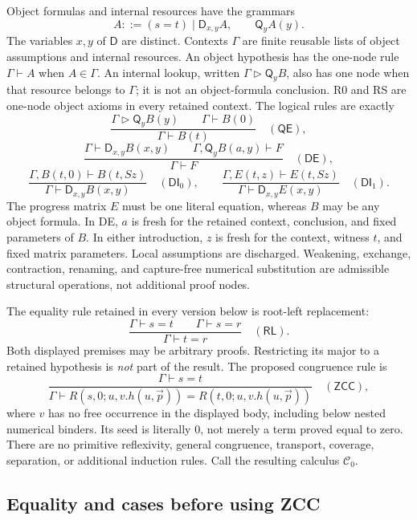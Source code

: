 Object formulas and internal resources have the grammars
\[
 A::=(s=t)\mid\mathsf D_{x,y}A,
 \qquad \mathsf Q_yA(y).
\]
The variables $x,y$ of $\mathsf D$ are distinct. Contexts $\Gamma$ are
finite reusable lists of object assumptions and internal resources.
An object hypothesis has the one-node rule $\Gamma\vdash A$ when
$A\in\Gamma$. An internal lookup, written
$\Gamma\mathrel{\triangleright}\mathsf Q_yB$, also has one node when
that resource belongs to $\Gamma$; it is not an object-formula conclusion.
R0 and RS are one-node object axioms in every retained context.
The logical rules are exactly
\[
 \frac{\Gamma\mathrel{\triangleright}\mathsf Q_yB(y)
       \qquad\Gamma\vdash B(0)}
      {\Gamma\vdash B(t)}\quad(\mathsf{QE}),
\]
\[
 \frac{\Gamma\vdash\mathsf D_{x,y}B(x,y)\qquad
       \Gamma,\mathsf Q_yB(a,y)\vdash F}
      {\Gamma\vdash F}\quad(\mathsf{DE}),
\]
\[
 \frac{\Gamma,B(t,0)\vdash B(t,Sz)}
      {\Gamma\vdash\mathsf D_{x,y}B(x,y)}
      \quad(\mathsf{DI}_{0}),
 \qquad
 \frac{\Gamma,E(t,z)\vdash E(t,Sz)}
      {\Gamma\vdash\mathsf D_{x,y}E(x,y)}
      \quad(\mathsf{DI}_{1}).
\]
The progress matrix $E$ must be one literal equation, whereas $B$ may
be any object formula. In DE, $a$ is fresh for the retained context,
conclusion, and fixed parameters of $B$. In either introduction, $z$
is fresh for the context, witness $t$, and fixed matrix parameters.
Local assumptions are discharged. Weakening, exchange, contraction,
renaming, and capture-free numerical substitution are admissible
structural operations, not additional proof nodes.

The equality rule retained in every version below is root-left replacement:
\[
 \frac{\Gamma\vdash s=t\qquad\Gamma\vdash s=r}
      {\Gamma\vdash t=r}\quad(\mathsf{RL}).
 \label{zcc:root}
\]
Both displayed premises may be arbitrary proofs. Restricting its major
to a retained hypothesis is \emph{not} part of the result.
The proposed congruence rule is
\[
 \frac{\Gamma\vdash s=t}
 {\Gamma\vdash R(s,0;u,v.h(u,\vec p))=
                  R(t,0;u,v.h(u,\vec p))}
 \quad(\mathsf{ZCC}),
 \label{zcc:rule}
\]
where $v$ has no free occurrence in the displayed body, including below
nested numerical binders. Its seed is literally $0$, not merely a term
proved equal to zero. There are no primitive reflexivity, general
congruence, transport, coverage, separation, or additional induction rules.
Call the resulting calculus $\mathcal C_0$.

\subsection{Equality and cases before using ZCC}

